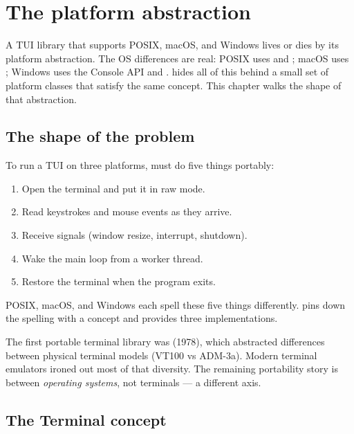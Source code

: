 \chapter{The platform abstraction}
\label{ch:platform}

\begin{aside}
A TUI library that supports POSIX, macOS, and Windows lives or
dies by its platform abstraction. The OS differences are real:
POSIX uses  and ; macOS uses
; Windows uses the Console API and
. \maya{} hides all of this behind
a small set of platform classes that satisfy the same concept.
This chapter walks the shape of that abstraction.
\end{aside}

\section{The shape of the problem}

To run a TUI on three platforms, \maya{} must do five things
portably:

\begin{enumerate}[leftmargin=*]
  \item Open the terminal and put it in raw mode.
  \item Read keystrokes and mouse events as they arrive.
  \item Receive signals (window resize, interrupt, shutdown).
  \item Wake the main loop from a worker thread.
  \item Restore the terminal when the program exits.
\end{enumerate}

POSIX, macOS, and Windows each spell these five things
differently. \maya{} pins down the spelling with a concept and
provides three implementations.

\begin{funfact}
The first portable terminal library was  (1978),
which abstracted differences between physical terminal models
(VT100 vs ADM-3a). Modern terminal emulators ironed out most of
that diversity. The remaining portability story is between
\emph{operating systems}, not terminals --- a different axis.
\end{funfact}

\section{The Terminal concept}


